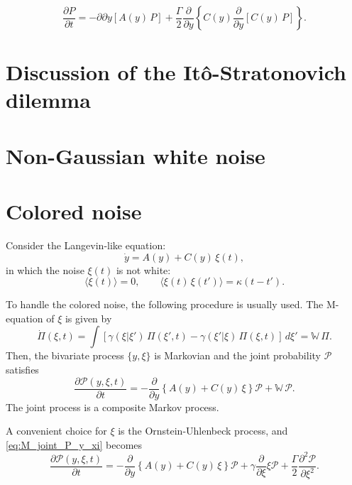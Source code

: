 \documentclass{book}
\numberwithin{equation}{section}
\theoremstyle{plain}
\theoremstyle{definition}
\theoremstyle{remark}
\begin{document}
$$
\frac{ \partial P }{ \partial t }
=
-{ \partial } { \partial y } [ A(y) \, P ]
+
\frac{ \Gamma } { 2 } \frac{ \partial } { \partial y }
\left\{
  C(y)
  \frac{ \partial } { \partial y } [ C(y) \, P ]
\right\}.
$$

\section{Discussion of the It\^o-Stratonovich dilemma}

\section{Non-Gaussian white noise}

\section{Colored noise}

Consider the Langevin-like equation:
\begin{equation}
  \dot y = A(y) + C(y) \, \xi(t),
  \label{eq:Langevin_colored}
\end{equation}
in which the noise $\xi(t)$ is not white:
\begin{equation}
\langle \xi(t) \rangle = 0,
\qquad
\langle \xi(t) \, \xi(t') \rangle = \kappa(t - t').
\label{eq:colored_noise}
\end{equation}


To handle the colored noise, the following procedure
is usually used.
%
The M-equation of $\xi$ is given by
\begin{equation}
  \dot \Pi(\xi, t)
  =
  \int \left[
    \gamma(\xi|\xi') \, \Pi(\xi', t)
    -
    \gamma(\xi'|\xi) \, \Pi(\xi, t)
  \right] \, d\xi'
  =
  \mathbb{W} \, \Pi.
\end{equation}
Then,
the bivariate process $\{ y, \xi \}$ is Markovian
and the joint probability $\mathscr P$ satisfies
\begin{equation}
  \frac{ \partial \mathscr P(y, \xi, t) }{ \partial t }
  =
  - \frac{ \partial } { \partial y }
  \left\{
    A(y) + C(y) \, \xi
  \right\} \mathscr P
  +
  \mathbb W \, \mathscr P.
  \label{eq:M_joint_P_y_xi}
\end{equation}
The joint process is a composite Markov process.


A convenient choice for $\xi$ is the Ornstein-Uhlenbeck process,
and \eqref{eq:M_joint_P_y_xi} becomes
\begin{equation}
  \frac{ \partial \mathscr P(y, \xi, t) }{ \partial t }
  =
  - \frac{ \partial } { \partial y }
  \left\{
    A(y) + C(y) \, \xi
  \right\} \mathscr P
  +
  \gamma \frac{ \partial } { \partial \xi } \xi \mathscr P
  +\frac{ \Gamma } { 2 }
  \frac{ \partial^2 \mathscr P } { \partial \xi^2 }.
  \label{eq:FP_joint_y_xi}
\end{equation}
\end{document}
